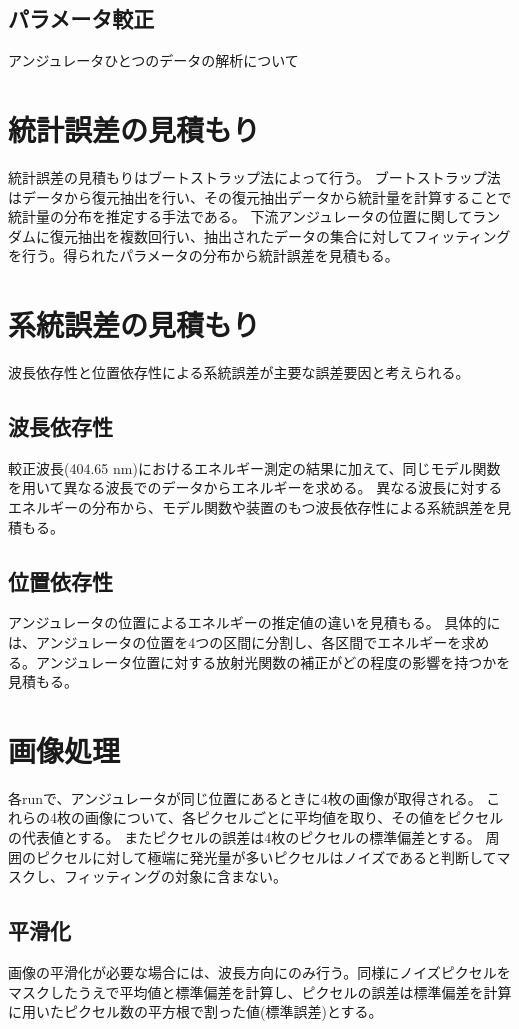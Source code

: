 \documentclass[a4paper,11pt,uplatex]{jsbook}
\begin{document}
\subsection{パラメータ較正}
アンジュレータひとつのデータの解析について

\section{統計誤差の見積もり}
統計誤差の見積もりはブートストラップ法によって行う。
ブートストラップ法はデータから復元抽出を行い、その復元抽出データから統計量を計算することで統計量の分布を推定する手法である。
下流アンジュレータの位置に関してランダムに復元抽出を複数回行い、抽出されたデータの集合に対してフィッティングを行う。得られたパラメータの分布から統計誤差を見積もる。
\section{系統誤差の見積もり}
波長依存性と位置依存性による系統誤差が主要な誤差要因と考えられる。
\subsection{波長依存性}
較正波長(404.65 nm)におけるエネルギー測定の結果に加えて、同じモデル関数を用いて異なる波長でのデータからエネルギーを求める。
異なる波長に対するエネルギーの分布から、モデル関数や装置のもつ波長依存性による系統誤差を見積もる。
\subsection{位置依存性}
アンジュレータの位置によるエネルギーの推定値の違いを見積もる。
具体的には、アンジュレータの位置を4つの区間に分割し、各区間でエネルギーを求める。アンジュレータ位置に対する放射光関数の補正がどの程度の影響を持つかを見積もる。

\section{画像処理}
各runで、アンジュレータが同じ位置にあるときに4枚の画像が取得される。
これらの4枚の画像について、各ピクセルごとに平均値を取り、その値をピクセルの代表値とする。
またピクセルの誤差は4枚のピクセルの標準偏差とする。
周囲のピクセルに対して極端に発光量が多いピクセルはノイズであると判断してマスクし、フィッティングの対象に含まない。
\subsection{平滑化}
画像の平滑化が必要な場合には、波長方向にのみ行う。同様にノイズピクセルをマスクしたうえで平均値と標準偏差を計算し、ピクセルの誤差は標準偏差を計算に用いたピクセル数の平方根で割った値(標準誤差)とする。
\end{document}
